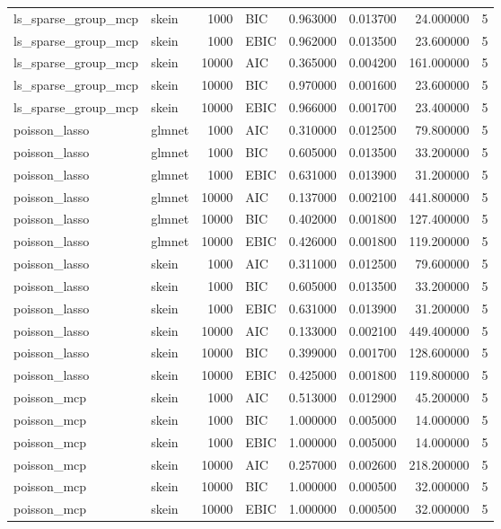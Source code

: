 \begin{table}[t]
\begin{tabular}{llrlrrrr}
ls_sparse_group_mcp & skein & 1000 & BIC & 0.963000 & 0.013700 & 24.000000 & 5 \\
ls_sparse_group_mcp & skein & 1000 & EBIC & 0.962000 & 0.013500 & 23.600000 & 5 \\
ls_sparse_group_mcp & skein & 10000 & AIC & 0.365000 & 0.004200 & 161.000000 & 5 \\
ls_sparse_group_mcp & skein & 10000 & BIC & 0.970000 & 0.001600 & 23.600000 & 5 \\
ls_sparse_group_mcp & skein & 10000 & EBIC & 0.966000 & 0.001700 & 23.400000 & 5 \\
poisson_lasso & glmnet & 1000 & AIC & 0.310000 & 0.012500 & 79.800000 & 5 \\
poisson_lasso & glmnet & 1000 & BIC & 0.605000 & 0.013500 & 33.200000 & 5 \\
poisson_lasso & glmnet & 1000 & EBIC & 0.631000 & 0.013900 & 31.200000 & 5 \\
poisson_lasso & glmnet & 10000 & AIC & 0.137000 & 0.002100 & 441.800000 & 5 \\
poisson_lasso & glmnet & 10000 & BIC & 0.402000 & 0.001800 & 127.400000 & 5 \\
poisson_lasso & glmnet & 10000 & EBIC & 0.426000 & 0.001800 & 119.200000 & 5 \\
poisson_lasso & skein & 1000 & AIC & 0.311000 & 0.012500 & 79.600000 & 5 \\
poisson_lasso & skein & 1000 & BIC & 0.605000 & 0.013500 & 33.200000 & 5 \\
poisson_lasso & skein & 1000 & EBIC & 0.631000 & 0.013900 & 31.200000 & 5 \\
poisson_lasso & skein & 10000 & AIC & 0.133000 & 0.002100 & 449.400000 & 5 \\
poisson_lasso & skein & 10000 & BIC & 0.399000 & 0.001700 & 128.600000 & 5 \\
poisson_lasso & skein & 10000 & EBIC & 0.425000 & 0.001800 & 119.800000 & 5 \\
poisson_mcp & skein & 1000 & AIC & 0.513000 & 0.012900 & 45.200000 & 5 \\
poisson_mcp & skein & 1000 & BIC & 1.000000 & 0.005000 & 14.000000 & 5 \\
poisson_mcp & skein & 1000 & EBIC & 1.000000 & 0.005000 & 14.000000 & 5 \\
poisson_mcp & skein & 10000 & AIC & 0.257000 & 0.002600 & 218.200000 & 5 \\
poisson_mcp & skein & 10000 & BIC & 1.000000 & 0.000500 & 32.000000 & 5 \\
poisson_mcp & skein & 10000 & EBIC & 1.000000 & 0.000500 & 32.000000 & 5 \\
\bottomrule
\end{tabular}
\end{table}
